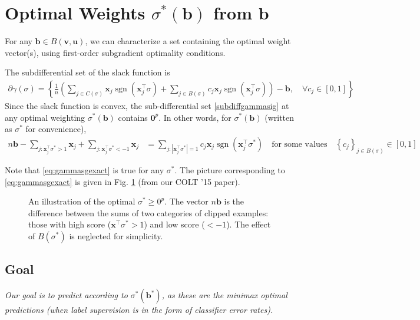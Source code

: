 \documentclass{article}
\newcommand{\vx}{\mathbf{x}}
\newcommand{\vb}{\mathbf{b}}
\newcommand{\vu}{\mathbf{u}}
\newcommand{\vv}{\mathbf{v}}
\newcommand{\vzero}{\mathbf{0}}
\DeclareMathOperator{\sgn}{sgn}
\newcommand{\abs}[1]{\left| #1 \right|}
\newcommand{\lrp}[1]{\left(#1\right)}
\newcommand{\lrsetb}[1]{\left\{#1\right\}}
\begin{document}
\section{Optimal Weights $\sigma^* (\vb)$ from $\vb$}

For any $\vb \in B (\vv,\vu)$, 
we can characterize a set containing the optimal weight vector(s), 
using first-order subgradient optimality conditions. 

The subdifferential set of the slack function is 
\begin{align}
\label{subdiffgammasig}
\partial \gamma (\sigma) 
= \left\{ \frac{1}{n} \lrp{ \sum_{j \in C(\sigma)} \vx_j \sgn(\vx_j^\top \sigma) 
+ \sum_{j \in B(\sigma)} c_j \vx_j \sgn(\vx_j^\top \sigma) } - \vb
, \quad \forall c_j \in [0,1]  \right\}
\end{align}
Since the slack function is convex, 
the sub-differential set \eqref{subdiffgammasig} at any optimal weighting $\sigma^* (\vb)$ contains $\vzero^p$. 
In other words, for $\sigma^* (\vb)$ (written as $\sigma^*$ for convenience),
\begin{align}
\label{eq:gammasgexact}
n \vb - \sum_{j : \vx_{j}^\top \sigma^* > 1} \vx_{j} + \sum_{j : \vx_{j}^\top \sigma^* < -1} \vx_{j} 
&= \sum_{j : \abs{\vx_{j}^\top \sigma^*} = 1} c_j \vx_{j} \sgn(\vx_{j}^\top \sigma^*)
\quad \mbox{for some values} \quad
\lrsetb{c_j}_{j \in B(\sigma)} \in [0,1]
\end{align} 

Note that \eqref{eq:gammasgexact} is true for any $\sigma^*$. 
The picture corresponding to \eqref{eq:gammasgexact} is given in Fig. \ref{fig:optsigma} (from our COLT '15 paper). 
\begin{figure}
\label{fig:optsigma}
\centering
\caption{\small An illustration of the optimal $\sigma^* \geq 0^p$. 
The vector $n \vb$ is the difference between the sums of two categories of clipped examples: 
those with high score ($\vx^\top \sigma^* > 1$) and low score ($< -1$).
The effect of $B (\sigma^*)$ is neglected for simplicity. 
}
\end{figure}



\subsection{Goal}
\label{sec:goal}

\emph{Our goal is to predict according to $\sigma^* (\vb^*)$, as these are the minimax optimal predictions 
(when label supervision is in the form of classifier error rates).}
\end{document}

